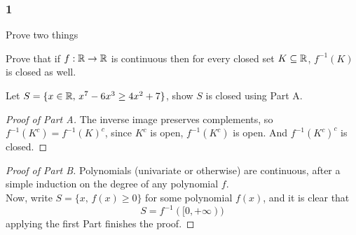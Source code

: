 \documentclass[../main.tex]{subfiles}
\begin{document}
\providecommand{\xn}{\{x_n\}}
\subsubsection*{1}
\begin{wts}
    Prove two things
    \begin{enumroman}
    \item Prove that if $f:\mathbb{R}\to\mathbb{R}$ is continuous then for every closed set $K\subseteq\mathbb{R}$, $f^{-1}(K)$ is closed as well.
    \item Let $S=\{x\in\mathbb{R},\, x^7 - 6x^3 \geq 4x^2 + 7\}$, show $S$ is closed using Part A.
    \end{enumroman}
\end{wts}
\begin{proof}[Proof of Part A]
    The inverse image preserves complements, so $f^{-1}(K^c)=f^{-1}(K)^c$, since $K^c$ is open, $f^{-1}(K^c)$ is open. And $f^{-1}(K^c)^c$ is closed.
\end{proof}
\begin{proof}[Proof of Part B]
    Polynomials (univariate or otherwise) are continuous, after a simple induction on the degree of any polynomial $f$.\\
    
    Now, write $S=\{x,\, f(x)\geq 0\}$ for some polynomial $f(x)$, and it is clear that \[S = f^{-1}([0,+\infty))\]
    applying the first Part finishes the proof.
\end{proof}
\end{document}
